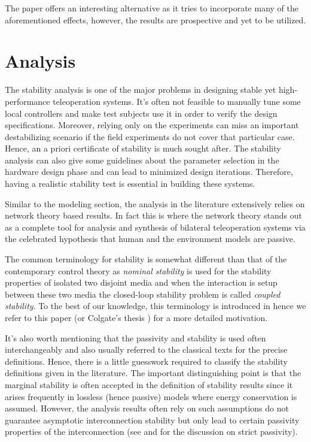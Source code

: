 The paper \cite{leelee} offers an interesting alternative as it tries to incorporate many of the aforementioned 
effects, however, the results are prospective and yet to be utilized. 



\section{Analysis}\label{sec:litchapanalysis}

The stability analysis is one of the major problems in designing stable yet high-performance teleoperation 
systems. It's often not feasible to manually tune some local controllers and make test subjects use it in order to verify the
design specifications. Moreover, relying only on the experiments can miss an important destabilizing scenario if the field 
experiments do not cover that particular case. Hence, an a priori certificate of stability is much sought after. The stability 
analysis can also give some guidelines about the parameter selection in the hardware design phase and can lead to minimized 
design iterations. Therefore, having a realistic stability test is essential in building these systems. 

Similar to the modeling section, the analysis in the literature extensively relies on network theory based results. In fact 
this is where the network theory stands out as a complete tool for analysis and synthesis of bilateral teleoperation systems
via the celebrated hypothesis that human and the environment models are passive.  

The common terminology for stability is somewhat different than that of the contemporary control theory as \emph{nominal stability} 
is used for the stability properties of isolated two disjoint media and when the interaction is setup between these two media the closed-loop 
stability problem is called \emph{coupled stability}. To the best of our knowledge, this terminology is introduced in 
\cite{colgatehogan88} hence we refer to this paper (or Colgate's thesis \cite{colgatephd}) for a more detailed motivation. 


It's also worth mentioning that the passivity and stability is used often interchangeably and also usually referred to the classical texts
\cite{haykin,mitra69,chen91} for the precise definitions. Hence, there is a little guesswork required to classify the stability definitions given in the
literature. The important distinguishing point is that the marginal stability is often accepted in the definition of stability results since
it arises frequently in lossless (hence passive) models where energy conservation is assumed. However, the analysis results often 
rely on such assumptions do not guarantee asymptotic interconnection stability but only lead to certain passivity 
properties of the interconnection (see \cite[Thm. 6.1]{khalil} and \cite[Sec. V]{lawrence} for the discussion on strict passivity).  

